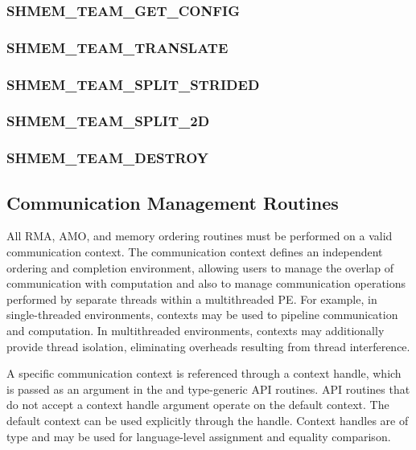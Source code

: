 \documentclass[10pt]{book}
\begin{document}
\subsubsection{\textbf{SHMEM\_TEAM\_GET\_CONFIG}}\label{subsec:shmem_team_get_config}


\subsubsection{\textbf{SHMEM\_TEAM\_TRANSLATE}}\label{subsec:shmem_team_translate}


\subsubsection{\textbf{SHMEM\_TEAM\_SPLIT\_STRIDED}}\label{subsec:shmem_team_split_strided}


\subsubsection{\textbf{SHMEM\_TEAM\_SPLIT\_2D}}\label{subsec:shmem_team_split_2d}


\subsubsection{\textbf{SHMEM\_TEAM\_DESTROY}}\label{subsec:shmem_team_destroy}

\color{Black}




\subsection{Communication Management Routines}
\label{sec:ctx}
All \openshmem \ac{RMA}, \ac{AMO}, and memory ordering routines must be
performed on a valid communication context.  The communication context defines an
independent ordering and completion environment, allowing users to manage the
overlap of communication with computation and also to manage communication
operations performed by separate threads within a multithreaded \ac{PE}.  For
example, in single-threaded environments, contexts may be used to pipeline
communication and computation.  In multithreaded environments, contexts may
additionally provide thread isolation, eliminating overheads resulting from
thread interference.

A specific communication context is referenced through a context handle, which is
passed as an argument in the \Cstd {} and type-generic \ac{API}
routines.  \ac{API} routines that do not accept a context handle argument operate on the
default context.  The default context can be used explicitly through the
 handle.
Context handles are of type  and may be used for
language-level assignment and equality comparison.
\end{document}
